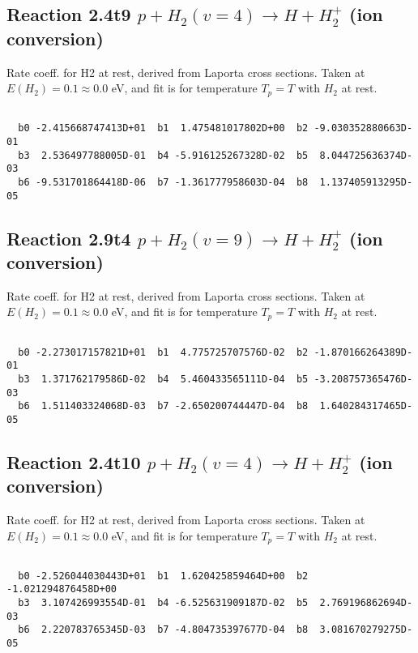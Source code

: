 \documentclass[12pt,dvipdfmx]{article}
\begin{document}
\newpage
\subsection{
Reaction 2.4t9
$ p + H_2(v=4) \rightarrow H + H_2^+$ (ion conversion)
}
Rate coeff. for H2 at rest, derived from Laporta cross sections.
Taken at $E(H_2) = 0.1 \approx 0.0$ eV,  and fit is for temperature $T_p=T$ with $H_2$ at rest.

\begin{small}\begin{verbatim}

  b0 -2.415668747413D+01  b1  1.475481017802D+00  b2 -9.030352880663D-01
  b3  2.536497788005D-01  b4 -5.916125267328D-02  b5  8.044725636374D-03
  b6 -9.531701864418D-06  b7 -1.361777958603D-04  b8  1.137405913295D-05

\end{verbatim}\end{small}

\newpage
\subsection{
Reaction 2.9t4
$ p + H_2(v=9) \rightarrow H + H_2^+$ (ion conversion)
}
Rate coeff. for H2 at rest, derived from Laporta cross sections.
Taken at $E(H_2) = 0.1 \approx 0.0$ eV,  and fit is for temperature $T_p=T$ with $H_2$ at rest.

\begin{small}\begin{verbatim}

  b0 -2.273017157821D+01  b1  4.775725707576D-02  b2 -1.870166264389D-01
  b3  1.371762179586D-02  b4  5.460433565111D-04  b5 -3.208757365476D-03
  b6  1.511403324068D-03  b7 -2.650200744447D-04  b8  1.640284317465D-05

\end{verbatim}\end{small}

\newpage
\subsection{
Reaction 2.4t10
$ p + H_2(v=4) \rightarrow H + H_2^+$ (ion conversion)
}
Rate coeff. for H2 at rest, derived from Laporta cross sections.
Taken at $E(H_2) = 0.1 \approx 0.0$ eV,  and fit is for temperature $T_p=T$ with $H_2$ at rest.

\begin{small}\begin{verbatim}

  b0 -2.526044030443D+01  b1  1.620425859464D+00  b2 -1.021294876458D+00
  b3  3.107426993554D-01  b4 -6.525631909187D-02  b5  2.769196862694D-03
  b6  2.220783765345D-03  b7 -4.804735397677D-04  b8  3.081670279275D-05

\end{verbatim}\end{small}
\end{document}
